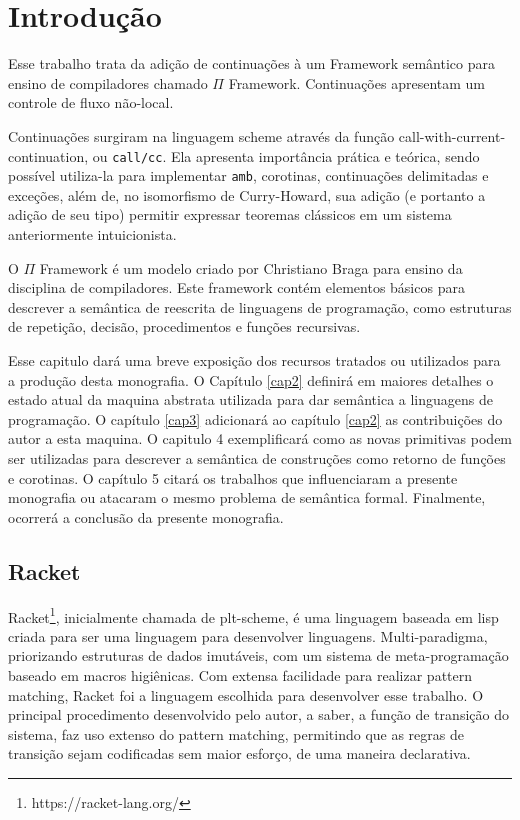 \chapter{Introdução}


Esse trabalho trata da adição de continuações à um Framework semântico para ensino de compiladores chamado $\Pi$ Framework. Continuações apresentam um controle de fluxo não-local. 

Continuações surgiram na linguagem scheme através da função call-with-current-continuation, ou \texttt{call/cc}. Ela apresenta importância prática e teórica, sendo possível utiliza-la para implementar \texttt{amb}, corotinas, continuações delimitadas e exceções, além de, no isomorfismo de Curry-Howard, sua adição (e portanto a adição de seu tipo) permitir expressar teoremas clássicos em um sistema anteriormente intuicionista.

O $\Pi$ Framework é um modelo criado por Christiano Braga para ensino da disciplina de compiladores. Este framework contém elementos básicos para descrever a semântica de reescrita de linguagens de programação, como estruturas de repetição, decisão, procedimentos e funções recursivas.

Esse capitulo dará uma breve exposição dos recursos tratados ou utilizados para a produção desta monografia. O Capítulo \ref{cap2} definirá em maiores detalhes o estado atual da maquina abstrata utilizada para dar semântica a linguagens de programação. O capítulo \ref{cap3} adicionará ao capítulo \ref{cap2} as contribuições do autor a esta maquina. O capitulo 4 exemplificará como as novas primitivas podem ser utilizadas para descrever a semântica de construções como retorno de funções e corotinas. O capítulo 5 citará os trabalhos que influenciaram a presente monografia ou atacaram o mesmo problema de semântica formal. Finalmente, ocorrerá a conclusão da presente monografia.

\section{Racket}
Racket\footnote{https://racket-lang.org/}, inicialmente chamada de plt-scheme, é uma linguagem baseada em lisp criada para ser uma linguagem para desenvolver linguagens. Multi-paradigma, priorizando estruturas de dados imutáveis, com um sistema de meta-programação baseado em macros higiênicas. Com extensa facilidade para realizar pattern matching, Racket foi a linguagem escolhida para desenvolver esse trabalho. O principal procedimento desenvolvido pelo autor, a saber, a função de transição do sistema, faz uso extenso do pattern matching, permitindo que as regras de transição sejam codificadas sem maior esforço, de uma maneira declarativa.

